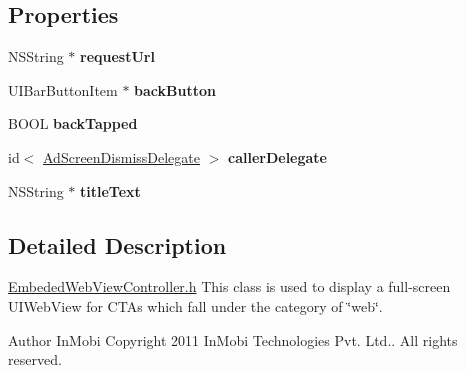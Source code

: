 \subsection*{Properties}
\begin{DoxyCompactItemize}
\item 
\hypertarget{interface_embeded_web_view_controller_ab9f786722e132f94acad0174792e1824}{
NSString $\ast$ {\bfseries requestUrl}}
\label{interface_embeded_web_view_controller_ab9f786722e132f94acad0174792e1824}

\item 
\hypertarget{interface_embeded_web_view_controller_abf4c87e90d6886e8af24beaae6a3a51f}{
UIBarButtonItem $\ast$ {\bfseries backButton}}
\label{interface_embeded_web_view_controller_abf4c87e90d6886e8af24beaae6a3a51f}

\item 
\hypertarget{interface_embeded_web_view_controller_ae09ddbc0f9e307e07c35aa1b49421150}{
BOOL {\bfseries backTapped}}
\label{interface_embeded_web_view_controller_ae09ddbc0f9e307e07c35aa1b49421150}

\item 
\hypertarget{interface_embeded_web_view_controller_a0a870b9d5e08edae990970238e03d45b}{
id$<$ \hyperlink{protocol_ad_screen_dismiss_delegate-p}{AdScreenDismissDelegate} $>$ {\bfseries callerDelegate}}
\label{interface_embeded_web_view_controller_a0a870b9d5e08edae990970238e03d45b}

\item 
\hypertarget{interface_embeded_web_view_controller_a4ee352efd4f0f0b310758b23b3ad764d}{
NSString $\ast$ {\bfseries titleText}}
\label{interface_embeded_web_view_controller_a4ee352efd4f0f0b310758b23b3ad764d}

\end{DoxyCompactItemize}


\subsection{Detailed Description}
\hyperlink{_embeded_web_view_controller_8h_source}{EmbededWebViewController.h} This class is used to display a full-\/screen UIWebView for CTAs which fall under the category of \char`\"{}web\char`\"{}. \begin{DoxyAuthor}{Author}
InMobi Copyright 2011 InMobi Technologies Pvt. Ltd.. All rights reserved. 
\end{DoxyAuthor}


